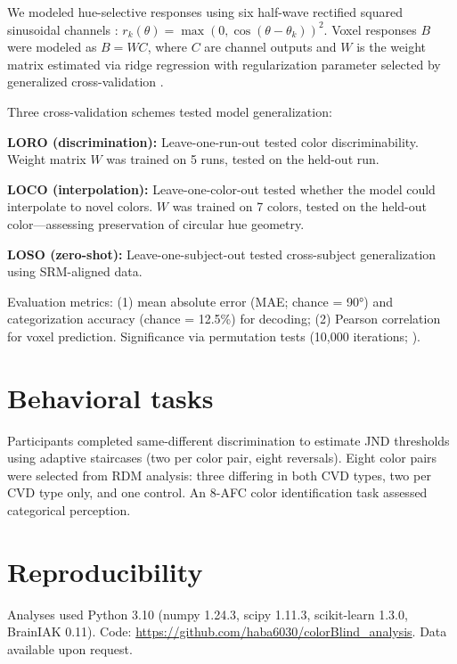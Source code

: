 We modeled hue-selective responses using six half-wave rectified squared sinusoidal channels \cite{brouwer2009, brouwer2013, freeman1991}: $r_k(\theta) = \max(0, \cos(\theta - \theta_k))^2$. Voxel responses $B$ were modeled as $B = WC$, where $C$ are channel outputs and $W$ is the weight matrix estimated via ridge regression with regularization parameter selected by generalized cross-validation \cite{golub1979}.

Three cross-validation schemes tested model generalization:

\textbf{LORO (discrimination):} Leave-one-run-out tested color discriminability. Weight matrix $W$ was trained on 5 runs, tested on the held-out run.

\textbf{LOCO (interpolation):} Leave-one-color-out tested whether the model could interpolate to novel colors. $W$ was trained on 7 colors, tested on the held-out color—assessing preservation of circular hue geometry.

\textbf{LOSO (zero-shot):} Leave-one-subject-out tested cross-subject generalization using SRM-aligned data.

Evaluation metrics: (1) mean absolute error (MAE; chance = 90°) and categorization accuracy (chance = 12.5\%) for decoding; (2) Pearson correlation for voxel prediction. Significance via permutation tests (10,000 iterations; \cite{nichols2002}).

\section{Behavioral tasks}

Participants completed same-different discrimination to estimate JND thresholds \cite{levitt1971} using adaptive staircases (two per color pair, eight reversals). Eight color pairs were selected from RDM analysis: three differing in both CVD types, two per CVD type only, and one control. An 8-AFC color identification task assessed categorical perception.

\section{Reproducibility}

Analyses used Python 3.10 (numpy 1.24.3, scipy 1.11.3, scikit-learn 1.3.0, BrainIAK 0.11). Code: \url{https://github.com/haba6030/colorBlind_analysis}. Data available upon request.

\clearpage


